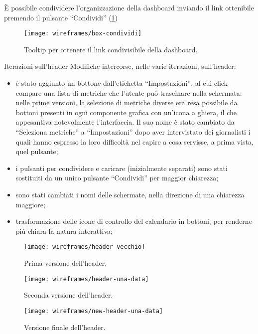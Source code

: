 \documentclass[../../../main.tex]{subfiles}
\begin{document}
\`E possibile condividere l'organizzazione della dashboard inviando il link ottenibile premendo il pulsante ``Condividi'' (\ref{fig:box-condividi})
\begin{figure}[H]
    \centering
    \texttt{[image: wireframes/box-condividi]}
    \caption{Tooltip per ottenere il link condivisibile della dashboard.}\label{fig:box-condividi}
\end{figure}


\begin{bclogo}{Iterazioni sull'header}
Modifiche intercorse, nelle varie iterazioni, sull'header:
\begin{itemize}
    \item è stato aggiunto un bottone dall'etichetta ``Impostazioni'', al cui click compare una lista di metriche che l'utente può trascinare nella schermata: nelle prime versioni, la selezione di metriche diverse era resa possibile da bottoni presenti in ogni componente grafica con un'icona a ghiera, il che appesantiva notevolmente l'interfaccia. Il suo nome è stato cambiato da ``Seleziona metriche'' a ``Impostazioni'' dopo aver intervistato dei giornalisti i quali hanno espresso la loro difficoltà nel capire a cosa servisse, a prima vista, quel pulsante;
    \item i pulsanti per condividere e caricare (inizialmente separati) sono stati sostituiti da un unico pulsante ``Condividi'' per maggior chiarezza;
    \item sono stati cambiati i nomi delle schermate, nella direzione di una chiarezza maggiore;
    \item trasformazione delle icone di controllo del calendario in bottoni, per renderne più chiara la natura interattiva;
\end{itemize}
\begin{figure}[H]
    \centering
    \texttt{[image: wireframes/header-vecchio]}
    \caption{Prima versione dell'header.}\label{fig:header-vecchio}
\end{figure}
\begin{figure}[H]
    \centering
    \texttt{[image: wireframes/header-una-data]}
    \caption{Seconda versione dell'header.}\label{fig:header-finale}
\end{figure}
\begin{figure}[H]
    \centering
    \texttt{[image: wireframes/new-header-una-data]}
    \caption{Versione finale dell'header.}\label{fig:new-header-finale}
\end{figure}
\end{bclogo}
\end{document}
